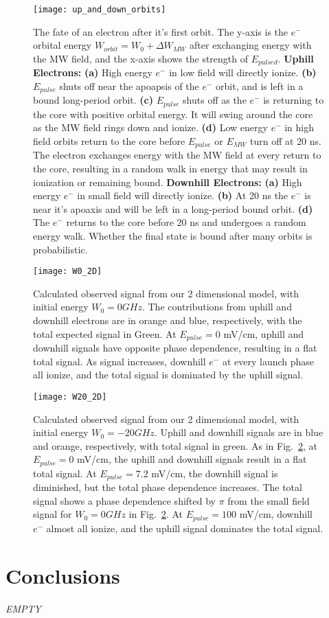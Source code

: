 \documentclass[aps,pra,preprint,groupedaddress]{revtex4-1}
\begin{document}
\begin{figure}
	\texttt{[image: up\_and\_down\_orbits]}
	\caption{The fate of an electron after it's first orbit. The y-axis is the $e^-$ orbital energy $W_{orbit} = W_0 + \Delta W_{MW}$ after exchanging energy with the MW field, and the x-axis shows the strength of $E_{pulsed}$. \textbf{Uphill Electrons:} \textbf{(a)} High energy $e^-$ in low field will directly ionize. \textbf{(b)} $E_{pulse}$ shuts off near the apoapsis of the $e^-$ orbit, and is left in a bound long-period orbit. \textbf{(c)} $E_{pulse}$ shuts off as the $e^-$ is returning to the core with positive orbital energy. It will swing around the core as the MW field rings down and ionize. \textbf{(d)} Low energy $e^-$ in high field orbits return to the core before $E_{pulse}$ or $E_{MW}$ turn off at 20 ns. The electron exchanges energy with the MW field at every return to the core, resulting in a random walk in energy that may result in ionization or remaining bound. \textbf{Downhill Electrons:} \textbf{(a)} High energy $e^-$ in small field will directly ionize. \textbf{(b)} At 20 ns the $e^-$ is near it's apoaxis and will be left in a long-period bound orbit. \textbf{(d)} The $e^-$ returns to the core before 20 ns and undergoes a random energy walk. Whether the final state is bound after many orbits is probabilistic.}
	\label{fig:orbits}	
\end{figure}

\begin{figure}
	\texttt{[image: W0\_2D]}
	\caption{Calculated observed signal from our 2 dimensional model, with initial energy $W_0 = 0 GHz$. The contributions from uphill and downhill electrons are in orange and blue, respectively, with the total expected signal in Green. At $E_{pulse} = 0$ mV/cm, uphill and downhill signals have opposite phase dependence, resulting in a flat total signal. As signal increases, downhill $e^-$ at every launch phase all ionize, and the total signal is dominated by the uphill signal.}
	\label{fig:2DW0}
\end{figure}

\begin{figure}
	\texttt{[image: W20\_2D]}
	\caption{Calculated observed signal from our 2 dimensional model, with initial energy $W_0 = -20 GHz$. Uphill and downhill signals are in blue and orange, respectively, with total signal in green. As in Fig.~\ref{fig:2DW0}, at $E_{pulse} = 0$ mV/cm, the uphill and downhill signals result in a flat total signal. At $E_{pulse} = 7.2$ mV/cm, the downhill signal is diminished, but the total phase dependence increases. The total signal shows a phase dependence shifted by $\pi$ from the small field signal for $W_0 = 0 GHz$ in Fig.~\ref{fig:2DW0}. At $E_{pulse} = 100$ mV/cm, downhill $e^-$ almost all ionize, and the uphill signal dominates the total signal.}
	\label{fig:2DW20}
\end{figure}

\section{\label{sec:conc} Conclusions}

\emph{EMPTY}

%
\end{document}
